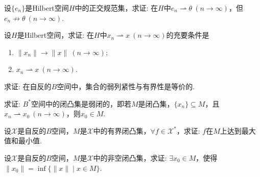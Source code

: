\documentclass[../../main.tex]{subfiles}%
\begin{document}
\begin{example}
设$\{e_n\}$是Hilbert空间$H$中的正交规范集，求证: 在$H$中$e_n\rightharpoonup \theta\ (n\to\infty)$，但$e_n\nrightarrow \theta\ (n\to\infty)$.
\end{example}

\begin{example}
设$H$是Hilbert空间，求证: 在$H$中$x_n\rightharpoonup x\ (n\to\infty)$的充要条件是
\begin{enumerate}[(1)]
\item $\|x_n\|\to\|x\|\ (n\to\infty)$;
\item $x_n\rightharpoonup x\ (n\to\infty)$.
\end{enumerate}
\end{example}

\begin{example}
求证: 在自反的$B$空间中，集合的弱列紧性与有界性是等价的.
\end{example}

\begin{example}
求证: $B^*$空间中的闭凸集是弱闭的，即若$M$是闭凸集，$\{x_n\}\subseteq M$，且$x_n\rightharpoonup x_0\ (n\to\infty)$，则$x_0\in M$.
\end{example}

\begin{example}
设$\mathscr{X}$是自反的$B$空间，$M$是$\mathscr{X}$中的有界闭凸集，$\forall f\in\mathscr{X}^*$，求证: $f$在$M$上达到最大值和最小值.
\end{example}

\begin{example}
设$\mathscr{X}$是自反的$B$空间，$M$是$\mathscr{X}$中的非空闭凸集，求证: $\exists x_0\in M$，使得$\|x_0\|=\inf\limits\{\|x\|\mid x\in M\}$.
\end{example}
\end{document}
